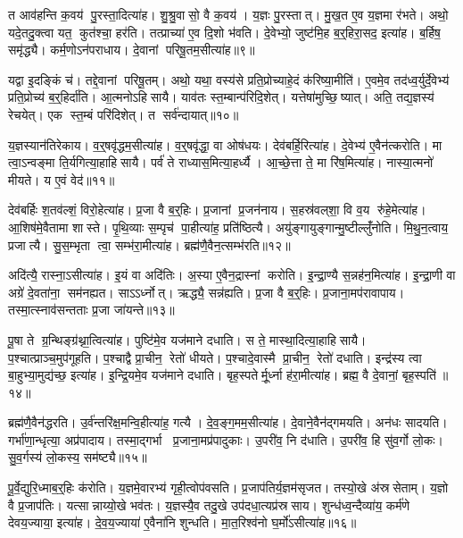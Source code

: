 त आव॑हन्ति क॒वय॑ पु॒रस्ता॒दित्या॑ह।
शु॒श्रु॒वासो॒ वै क॒वय॑।
य॒ज्ञः पु॒रस्तात्।
मु॒ख॒त ए॒व य॒ज्ञमा र॑भते।
अथो॒ यदे॒तदु॒क्त्वा यत॒ कुत॑श्चा॒ हर॑ति।
तत्प्राच्या॑ ए॒व दि॒शो भ॑वति।
दे॒वेभ्यो॒ जुष्ट॑मि॒ह ब॒र्॒हिरा॒सद॒ इत्या॑ह।
ब॒र्\mbox{}हिष॒ समृ॑द्ध्यै।
कर्म॒णोऽन॑पराधाय।
दे॒वानां परिषू॒तम॒सीत्या॑ह॥९॥

यद्वा इ॒दङ्किं च॑।
तद्दे॒वानां परिषू॒तम्।
अथो॒ यथा॒ वस्य॑से प्रति॒प्रोच्याहे॒दं क॑रिष्या॒मीति॑।
ए॒वमे॒व तद॑ध्व॒र्युर्दे॒वेभ्य॑ प्रति॒प्रोच्य॑ ब॒र्॒हिर्दा॑ति।
आ॒त्मनोऽहिसायै।
याव॑तः स्त॒म्बान्प॑रिदि॒शेत्।
यत्तेषा॑मुच्छि॒ष्यात्।
अति॒ तद्य॒ज्ञस्य॑ रेचयेत्।
एक स्त॒म्बं परि॑दिशेत्।
त सर्व॑न्दायात्॥१०॥

य॒ज्ञस्यान॑तिरेकाय।
व॒र्॒षवृ॑द्धम॒सीत्या॑ह।
व॒र्॒षवृ॑द्धा॒ वा ओष॑धयः।
देव॑बर्\mbox{}हि॒रित्या॑ह।
दे॒वेभ्य॑ ए॒वैन॑त्करोति।
मा त्वा॒ऽन्वङ्मा ति॒र्यगित्या॒हाहिसायै।
पर्व॑ ते राध्यास॒मित्या॒हर्ध्यै।
आ॒च्छे॒त्ता ते॒ मा रि॑ष॒मित्या॑ह।
नास्या॒त्मनो॑ मीयते।
य ए॒वं वेद॑॥११॥

देव॑बर्\mbox{}हिः श॒तव॑ल्\mbox{}शं॒ विरो॒हेत्या॑ह।
प्र॒जा वै ब॒र्॒हिः।
प्र॒जानां प्र॒जन॑नाय।
स॒हस्र॑वल्‌शा॒ वि व॒य रु॑हे॒मेत्या॑ह।
आ॒शिष॑मे॒वैतामा शास्ते।
पृ॒थि॒व्याः स॒म्पृच॑ पा॒हीत्या॑ह॒ प्रति॑ष्ठित्यै।
अयु॑ङ्गायुङ्गान्मु॒ष्टील्लुँ॑नोति।
मि॒थु॒न॒त्वाय॒ प्रजात्यै।
सु॒स॒म्भृता त्वा॒ सम्भ॑रा॒मीत्या॑ह।
ब्रह्म॑णै॒वैन॒त्सम्भ॑रति॥१२॥

अदि॑त्यै॒ रास्ना॒ऽसीत्या॑ह।
इ॒यं वा अदि॑तिः।
अ॒स्या ए॒वैन॒द्रास्नां करोति।
इ॒न्द्रा॒ण्यै स॒न्नह॑न॒मित्या॑ह।
इ॒न्द्रा॒णी वा अग्रे॑ दे॒वता॑ना॒ सम॑नह्यत।
साऽऽर्ध्नोत्।
ऋद्ध्यै॒ सन्न॑ह्यति।
प्र॒जा वै ब॒र्॒हिः।
प्र॒जाना॒मप॑रावापाय।
तस्मा॒त्स्नाव॑सन्तताः प्र॒जा जा॑यन्ते॥१३॥

पू॒षा ते ग्र॒न्थिङ्ग्र॑थ्ना॒त्वित्या॑ह।
पुष्टि॑मे॒व यज॑माने दधाति।
स ते॒ मास्था॒दित्या॒हाहिसायै।
प॒श्चात्प्राञ्च॒मुप॑गूहति।
प॒श्चाद्वै प्रा॒चीन॒ रेतो॑ धीयते।
प॒श्चादे॒वास्मै प्रा॒चीन॒ रेतो॑ दधाति।
इन्द्र॑स्य त्वा बा॒हुभ्या॒मुद्य॑च्छ॒ इत्या॑ह।
इ॒न्द्रि॒यमे॒व यज॑माने दधाति।
बृह॒स्पतेर्मू॒र्ध्ना ह॑रा॒मीत्या॑ह।
ब्रह्म॒ वै दे॒वानां॒ बृह॒स्पति॑॥१४॥

ब्रह्म॑णै॒वैन॑द्धरति।
उ॒र्व॑न्तरि॑क्ष॒मन्वि॒हीत्या॑ह॒ गत्यै।
दे॒व॒ङ्ग॒मम॒सीत्या॑ह।
दे॒वाने॒वैन॑द्गमयति।
अन॑धः सादयति।
गर्भा॑णा॒न्धृत्या॒ अप्र॑पादाय।
तस्मा॒द्गर्भा प्र॒जाना॒मप्र॑पादुकाः।
उ॒परी॑व॒ नि द॑धाति।
उ॒परी॑व॒ हि सु॑व॒र्गो लो॒कः।
सु॒व॒र्गस्य॑ लो॒कस्य॒ सम॑ष्ट्यै॥१५॥\anuvakamend[स॒यो॒नि॒त्वाय॑ स्व॒धाकृ॑ता॒ऽसीत्या॑ह दाया॒द्वेद॑ भरति जायन्ते॒ बृह॒स्पति॒ सम॑ष्ट्यै]

पू॒र्वे॒द्युरि॒ध्माब॒र्॒हिः क॑रोति।
य॒ज्ञमे॒वारभ्य॑ गृही॒त्वोप॑वसति।
प्र॒जाप॑तिर्य॒ज्ञम॑सृजत।
तस्यो॒खे अ॑स्रसेताम्।
य॒ज्ञो वै प्र॒जाप॑तिः।
यत्सान्नाय्यो॒खे भव॑तः।
य॒ज्ञस्यै॒व तदु॒खे उप॑दधा॒त्यप्र॑स्रसाय।
शुन्ध॑ध्व॒न्दैव्या॑य॒ कर्म॑णे देवय॒ज्याया॒ इत्या॑ह।
दे॒व॒य॒ज्याया॑ ए॒वैना॑नि शुन्धति।
मा॒त॒रिश्व॑नो घ॒र्मो॑ऽसीत्या॑ह॥१६॥

